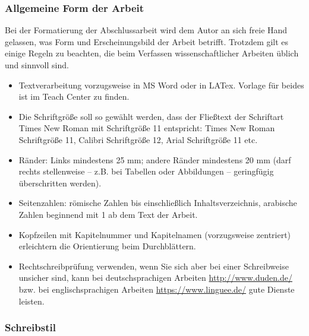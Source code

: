 \subsubsection{Allgemeine Form der Arbeit}
\label{sec:allgemeine form der arbeit}

Bei der Formatierung der Abschlussarbeit wird dem Autor an sich freie Hand gelassen, was Form und Erscheinungsbild der Arbeit betrifft. Trotzdem gilt es einige Regeln zu beachten, die beim Verfassen wissenschaftlicher Arbeiten üblich und sinnvoll sind. 

\begin{itemize}
    \item Textverarbeitung vorzugsweise in MS Word oder in LATex. Vorlage für beides ist im Teach Center zu finden.
    \item Die Schriftgröße soll so gewählt werden, dass der Fließtext der Schriftart Times New Roman mit Schriftgröße 11 entspricht: Times New Roman Schriftgröße 11, Calibri Schriftgröße 12, Arial Schriftgröße 11 etc.
    \item Ränder: Links mindestens 25 mm; andere Ränder mindestens 20 mm (darf rechts stellenweise – z.B. bei Tabellen oder Abbildungen – geringfügig überschritten werden).
    \item Seitenzahlen: römische Zahlen bis einschließlich Inhaltsverzeichnis, arabische Zahlen beginnend mit {\glqq}1{\grqq} ab dem Text der Arbeit.
    \item Kopfzeilen mit Kapitelnummer und Kapitelnamen (vorzugsweise zentriert) erleichtern die {\glqq}Orientierung{\grqq} beim Durchblättern.
    \item Rechtschreibprüfung verwenden, wenn Sie sich aber bei einer Schreibweise unsicher sind, kann bei deutschsprachigen Arbeiten \underline{http://www.duden.de/} bzw. bei englischsprachigen Arbeiten \underline{https://www.linguee.de/} gute Dienste leisten.

\end{itemize}

\newpage

\subsubsection{Schreibstil}

